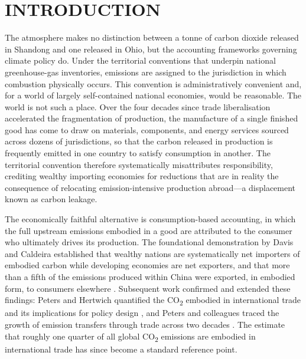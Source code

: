 \documentclass[letterpaper, 10 pt, conference]{ieeeconf}
\newcommand{\COO}{CO\textsubscript{2}}
\begin{document}
\section{INTRODUCTION}

The atmosphere makes no distinction between a tonne of carbon dioxide released in Shandong and one released in Ohio, but the accounting frameworks governing climate policy do. Under the territorial conventions that underpin national greenhouse-gas inventories, emissions are assigned to the jurisdiction in which combustion physically occurs. This convention is administratively convenient and, for a world of largely self-contained national economies, would be reasonable. The world is not such a place. Over the four decades since trade liberalisation accelerated the fragmentation of production, the manufacture of a single finished good has come to draw on materials, components, and energy services sourced across dozens of jurisdictions, so that the carbon released in production is frequently emitted in one country to satisfy consumption in another. The territorial convention therefore systematically misattributes responsibility, crediting wealthy importing economies for reductions that are in reality the consequence of relocating emission-intensive production abroad---a displacement known as carbon leakage.\par

The economically faithful alternative is consumption-based accounting, in which the full upstream emissions embodied in a good are attributed to the consumer who ultimately drives its production. The foundational demonstration by Davis and Caldeira established that wealthy nations are systematically net importers of embodied carbon while developing economies are net exporters, and that more than a fifth of the emissions produced within China were exported, in embodied form, to consumers elsewhere \cite{davis2010}. Subsequent work confirmed and extended these findings: Peters and Hertwich quantified the \COO{} embodied in international trade and its implications for policy design \cite{peters2008}, and Peters and colleagues traced the growth of emission transfers through trade across two decades \cite{peters2011}. The estimate that roughly one quarter of all global \COO{} emissions are embodied in international trade has since become a standard reference point.\par
\end{document}
